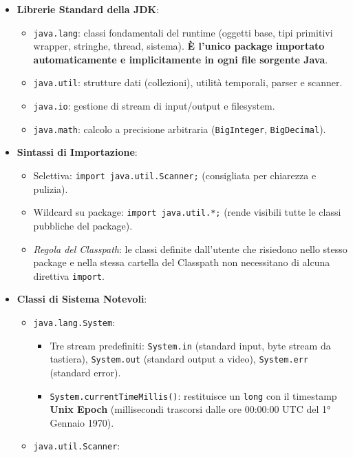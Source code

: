 \documentclass[11pt,a4paper]{article}
\newcommand{\passthrough}[1]{#1}
\providecommand{\tightlist}{\setlength{\itemsep}{0pt}\setlength{\parskip}{0pt}}
\begin{document}
\begin{itemize}
\tightlist
\item
  \textbf{Librerie Standard della JDK}:

  \begin{itemize}
  \tightlist
  \item
    \passthrough{\lstinline!java.lang!}: classi fondamentali del runtime
    (oggetti base, tipi primitivi wrapper, stringhe, thread, sistema).
    \textbf{È l'unico package importato automaticamente e implicitamente
    in ogni file sorgente Java}.
  \item
    \passthrough{\lstinline!java.util!}: strutture dati (collezioni),
    utilità temporali, parser e scanner.
  \item
    \passthrough{\lstinline!java.io!}: gestione di stream di
    input/output e filesystem.
  \item
    \passthrough{\lstinline!java.math!}: calcolo a precisione arbitraria
    (\passthrough{\lstinline!BigInteger!},
    \passthrough{\lstinline!BigDecimal!}).
  \end{itemize}
\item
  \textbf{Sintassi di Importazione}:

  \begin{itemize}
  \tightlist
  \item
    Selettiva: \passthrough{\lstinline!import java.util.Scanner;!}
    (consigliata per chiarezza e pulizia).
  \item
    Wildcard su package: \passthrough{\lstinline!import java.util.*;!}
    (rende visibili tutte le classi pubbliche del package).
  \item
    \emph{Regola del Classpath}: le classi definite dall'utente che
    risiedono nello stesso package e nella stessa cartella del Classpath
    non necessitano di alcuna direttiva
    \passthrough{\lstinline!import!}.
  \end{itemize}
\item
  \textbf{Classi di Sistema Notevoli}:

  \begin{itemize}
  \tightlist
  \item
    \passthrough{\lstinline!java.lang.System!}:

    \begin{itemize}
    \tightlist
    \item
      Tre stream predefiniti: \passthrough{\lstinline!System.in!}
      (standard input, byte stream da tastiera),
      \passthrough{\lstinline!System.out!} (standard output a video),
      \passthrough{\lstinline!System.err!} (standard error).
    \item
      \passthrough{\lstinline!System.currentTimeMillis()!}: restituisce
      un \passthrough{\lstinline!long!} con il timestamp \textbf{Unix
      Epoch} (millisecondi trascorsi dalle ore 00:00:00 UTC del 1°
      Gennaio 1970).
    \end{itemize}
  \item
    \passthrough{\lstinline!java.util.Scanner!}:


\end{itemize}
\end{itemize}
\end{document}
